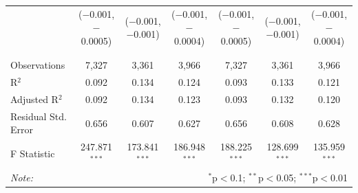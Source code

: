 \documentclass[alpha-refs]{wiley-article-01g}
\begin{document}
\begin{landscape}
\begin{table}[!htbp]
\begin{tabular}{@{\extracolsep{5pt}}lcccccc}
			& ($-$0.001, $-$0.0005) & ($-$0.001, $-$0.001) & ($-$0.001, $-$0.0004) & ($-$0.001, $-$0.0005) & ($-$0.001, $-$0.001) & ($-$0.001, $-$0.0004) \\ 
			& & & & & & \\ 
			\hline \\[-.8ex] 
			Observations & 7,327 & 3,361 & 3,966 & 7,327 & 3,361 & 3,966 \\ 
			R$^{2}$ & 0.092 & 0.134 & 0.124 & 0.093 & 0.133 & 0.121 \\ 
			Adjusted R$^{2}$ & 0.092 & 0.134 & 0.123 & 0.093 & 0.132 & 0.120 \\ 
			Residual Std. Error & 0.656 & 0.607 & 0.627 & 0.656 & 0.608 & 0.628 \\ 
			F Statistic & 247.871$^{***}$ & 173.841$^{***}$ & 186.948$^{***}$ & 188.225$^{***}$ & 128.699$^{***}$ & 135.959$^{***}$ \\ 
			\hline 
			\textit{Note:}  & \multicolumn{6}{r}{$^{*}$p$<$0.1; $^{**}$p$<$0.05; $^{***}$p$<$0.01} \\ 
		\end{tabular} 
	\end{table} 
	
\end{landscape}

\newpage
\end{document}
